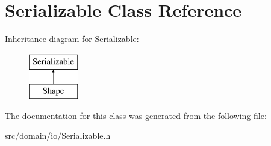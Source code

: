 \hypertarget{class_serializable}{}\section{Serializable Class Reference}
\label{class_serializable}
Inheritance diagram for Serializable\+:\begin{figure}[H]
\begin{center}
\leavevmode
\includegraphics[height=2.000000cm]{class_serializable}
\end{center}
\end{figure}


The documentation for this class was generated from the following file\+:\begin{DoxyCompactItemize}
\item 
src/domain/io/Serializable.\+h\end{DoxyCompactItemize}
